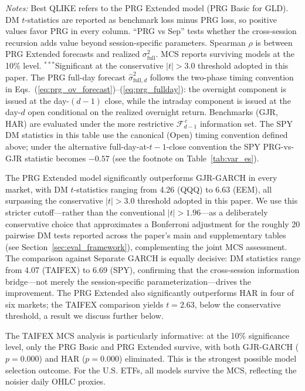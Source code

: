 \documentclass[11pt,a4paper]{article}
\begin{document}
\begin{table}[htbp]
\begin{flushleft}
\emph{Notes:} Best QLIKE refers to the PRG Extended model (PRG Basic for GLD). DM $t$-statistics are reported as benchmark loss minus PRG loss, so positive values favor PRG in every column. ``PRG vs Sep'' tests whether the cross-session recursion adds value beyond session-specific parameters. Spearman $\rho$ is between PRG Extended forecasts and realized $\sigma^2_{\text{full}}$. MCS reports surviving models at the 10\% level. $^{***}$Significant at the conservative $|t| > 3.0$ threshold adopted in this paper. The PRG full-day forecast $\hat{\sigma}^2_{\text{full},d}$ follows the two-phase timing convention in Eqs.~(\ref{eq:prg_ov_forecast})--(\ref{eq:prg_fullday}): the overnight component is issued at the day-$(d-1)$ close, while the intraday component is issued at the day-$d$ open conditional on the realized overnight return. Benchmarks (GJR, HAR) are evaluated under the more restrictive $\mathcal{F}_{d-1}^{\,c}$ information set. The SPY DM statistics in this table use the canonical (Open) timing convention defined above; under the alternative full-day-at-$t\!-\!1$-close convention the SPY PRG-vs-GJR statistic becomes $-0.57$ (see the footnote on Table~\ref{tab:var_es}).
\end{flushleft}
\end{table}

The PRG Extended model significantly outperforms GJR-GARCH in every market, with DM $t$-statistics ranging from 4.26 (QQQ) to 6.63 (EEM), all surpassing the conservative $|t|>3.0$ threshold adopted in this paper. We use this stricter cutoff---rather than the conventional $|t|>1.96$---as a deliberately conservative choice that approximates a Bonferroni adjustment for the roughly 20 pairwise DM tests reported across the paper's main and supplementary tables (see Section~\ref{sec:eval_framework}), complementing the joint \citet{Hansen2011MCS} MCS assessment. The comparison against Separate GARCH is equally decisive: DM statistics range from 4.07 (TAIFEX) to 6.69 (SPY), confirming that the cross-session information bridge---not merely the session-specific parameterization---drives the improvement. The PRG Extended also significantly outperforms HAR in four of six markets; the TAIFEX comparison yields $t = 2.63$, below the conservative threshold, a result we discuss further below.

The TAIFEX MCS analysis is particularly informative: at the 10\% significance level, only the PRG Basic and PRG Extended survive, with both GJR-GARCH ($p = 0.000$) and HAR ($p = 0.000$) eliminated. This is the strongest possible model selection outcome. For the U.S. ETFs, all models survive the MCS, reflecting the noisier daily OHLC proxies.
\end{document}
